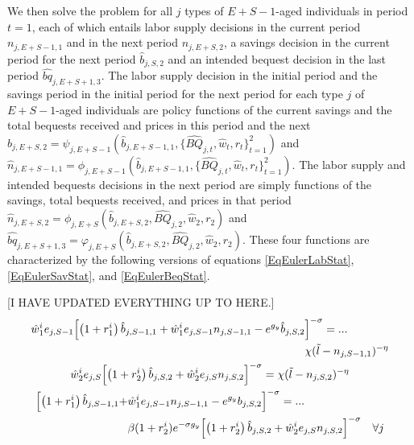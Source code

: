 \documentclass[letterpaper,12pt]{article}
\theoremstyle{definition}
\begin{document}
  We then solve the problem for all $j$ types of $E+S-1$-aged individuals in period $t=1$, each of which entails labor supply decisions in the current period $n_{j,E+S-1,1}$ and in the next period $n_{j,E+S,2}$, a savings decision in the current period for the next period $\hat{b}_{j,S,2}$ and an intended bequest decision in the last period $\hat{bq}_{j,E+S+1,3}$. The labor supply decision in the initial period and the savings period in the initial period for the next period for each type $j$ of $E+S-1$-aged individuals are policy functions of the current savings and the total bequests received and prices in this period and the next $\hat{b}_{j,E+S,2} = \psi_{j,E+S-1}(\hat{b}_{j,E+S-1,1},\{\hat{BQ}_{j,t},\hat{w}_t,r_t\}_{t=1}^2)$ and $\hat{n}_{j,E+S-1,1} = \phi_{j,E+S-1}(\hat{b}_{j,E+S-1,1},\{\hat{BQ}_{j,t},\hat{w}_t,r_t\}_{t=1}^2)$. The labor supply and intended bequests decisions in the next period are simply functions of the savings, total bequests received, and prices in that period $\hat{n}_{j,E+S,2} = \phi_{j,E+S}(\hat{b}_{j,E+S,2},\hat{BQ}_{j,2},\hat{w}_2,r_2)$ and $\hat{bq}_{j,E+S+1,3} = \varphi_{j,E+S}(\hat{b}_{j,E+S,2},\hat{BQ}_{j,2},\hat{w}_2,r_2)$. These four functions are characterized by the following versions of equations \eqref{EqEulerLabStat}, \eqref{EqEulerSavStat}, and \eqref{EqEulerBeqStat}.

  [I HAVE UPDATED EVERYTHING UP TO HERE.]
  \begin{gather}
    \begin{split}
      \hat{w}^i_1 e_{j,S-1}\Bigl[\left(1+r^i_1\right)\hat{b}_{j,S-1,1} + \hat{w}^i_1 e_{j,S-1}n_{j,S-1,1} - e^{g_y}\hat{b}_{j,S,2}&\Bigr]^{-\sigma} = ... \\
      &\chi(\tilde{l} - n_{j,S-1,1})^{-\eta}
    \end{split} \label{EqEulerSm1labt1} \\
    \hat{w}^i_2 e_{j,S}\Bigl[\left(1+r^i_2\right)\hat{b}_{j,S,2} + \hat{w}^i_2 e_{j,S}n_{j,S,2}\Bigr]^{-\sigma} = \chi(\tilde{l} - n_{j,S,2})^{-\eta} \label{EqEulerSlabt2} \\
    \begin{split}
      \Bigl[\left(1+r^i_1\right)\hat{b}_{j,S-1,1} + &\hat{w}^i_1 e_{j,S-1}n_{j,S-1,1} - e^{g_y}b_{j,S,2}\Bigr]^{-\sigma} = ... \\
      &\beta(1+r^i_2)e^{-\sigma g_y}\Bigl[\left(1+r^i_2\right)\hat{b}_{j,S,2} + \hat{w}^i_2 e_{j,S}n_{j,S,2}\Bigr]^{-\sigma} \quad\forall j
    \end{split}\label{EqEulerSm1savt1}
  \end{gather}
\end{document}
